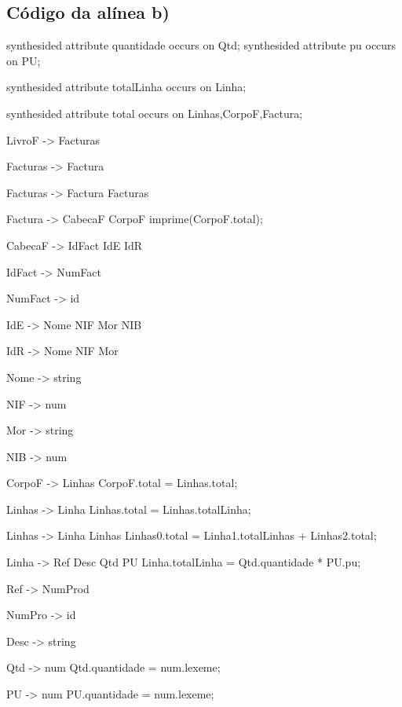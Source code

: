 \documentclass[11pt,a4paper]{article}
\begin{document}
\subsection{Código da alínea b)}
\begin{code_txt}
synthesided attribute quantidade occurs on Qtd;
synthesided attribute pu occurs on PU;

synthesided attribute totalLinha occurs on Linha;

synthesided attribute total occurs on Linhas,CorpoF,Factura;



LivroF -> Facturas

Facturas -> Factura

Facturas -> Factura Facturas

Factura -> CabecaF CorpoF {imprime(CorpoF.total);}

CabecaF -> IdFact IdE IdR

IdFact -> NumFact

NumFact -> id

IdE -> Nome NIF Mor NIB

IdR -> Nome NIF Mor

Nome -> string

NIF -> num

Mor -> string

NIB -> num

CorpoF -> Linhas {CorpoF.total = Linhas.total;}

Linhas -> Linha {Linhas.total = Linhas.totalLinha;}

Linhas -> Linha Linhas {Linhas0.total = Linha1.totalLinhas + Linhas2.total;}

Linha -> Ref Desc Qtd PU {Linha.totalLinha = Qtd.quantidade * PU.pu;}

Ref -> NumProd

NumPro -> id

Desc -> string

Qtd -> num { Qtd.quantidade = num.lexeme;}

PU -> num { PU.quantidade = num.lexeme;}




\end{code_txt}
\newpage
\end{document}
